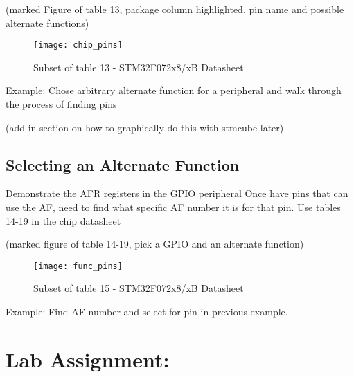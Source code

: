 \documentclass[11pt,fleqn]{book} %
\begin{document}
    (marked Figure of table 13, package column highlighted, pin name and possible alternate functions)
    \begin{figure}[]
        \centering\texttt{[image: chip\_pins]}
        \caption{Subset of table 13 - STM32F072x8/xB Datasheet}
        \label{chip_pins}
    \end{figure}

    \begin{example}
            Example: Chose arbitrary alternate function for a peripheral and walk through the process of finding pins
    \end{example}
    (add in section on how to graphically do this with stmcube later)
    
    \subsection{Selecting an Alternate Function}
    Demonstrate the AFR registers in the GPIO peripheral
    Once have pins that can use the AF, need to find what specific AF number it is for that pin.
    Use tables 14-19 in the chip datasheet
    
    (marked figure of table 14-19, pick a GPIO and an alternate function) 
    \begin{figure}[]
        \centering\texttt{[image: func\_pins]}
        \caption{Subset of table 15 - STM32F072x8/xB Datasheet}
        \label{func_pins}
    \end{figure}
   	
    \begin{example} 
         Example: Find AF number and select for pin in previous example.
    \end{example}
    
\section{Lab Assignment:}
\end{document}
